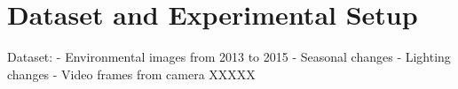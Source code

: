 \section{Dataset and Experimental Setup}
Dataset:
- Environmental images from 2013 to 2015
- Seasonal changes
- Lighting changes
- Video frames from camera XXXXX


